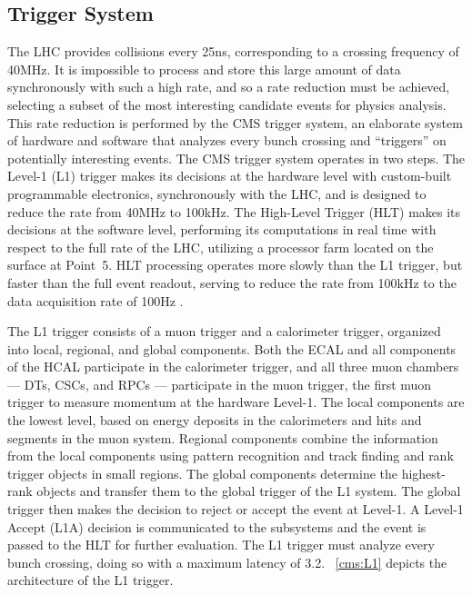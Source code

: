 \subsection{Trigger System}
\label{cms:trigger}
The LHC provides \pp collisions every 25\unit{ns}, corresponding to a crossing frequency of 40\unit{MHz}.
It is impossible to process and store this large amount of data synchronously with such a high rate, and so a rate reduction must be achieved, selecting a subset of the most interesting candidate events for physics analysis.
This rate reduction is performed by the CMS trigger system, an elaborate system of hardware and software that analyzes every bunch crossing and ``triggers'' on potentially interesting events.
The CMS trigger system operates in two steps.
The Level-1 (L1) trigger makes its decisions at the hardware level with custom-built programmable electronics, synchronously with the LHC, and is designed to reduce the rate from 40\unit{MHz} to 100\unit{kHz}.
The High-Level Trigger (HLT) makes its decisions at the software level, performing its computations in real time with respect to the full rate of the LHC, utilizing a processor farm located on the surface at Point~5.
HLT processing operates more slowly than the L1 trigger, but faster than the full event readout, serving to reduce the rate from 100\unit{kHz} to the data acquisition rate of 100\unit{Hz} \cite{Chatrchyan:2008zzk, Adam:2005zf}.

The L1 trigger consists of a muon trigger and a calorimeter trigger, organized into local, regional, and global components.
Both the ECAL and all components of the HCAL participate in the calorimeter trigger, and all three muon chambers --- DTs, CSCs, and RPCs --- participate in the muon trigger, the first muon trigger to measure momentum at the hardware Level-1.
The local components are the lowest level, based on energy deposits in the calorimeters and hits and segments in the muon system.
Regional components combine the information from the local components using pattern recognition and track finding and rank trigger objects in small regions.
The global components determine the highest-rank objects and transfer them to the global trigger of the L1 system.
The global trigger then makes the decision to reject or accept the event at Level-1.
A Level-1 Accept (L1A) decision is communicated to the subsystems and the event is passed to the HLT for further evaluation.
The L1 trigger must analyze every bunch crossing, doing so with a maximum latency of 3.2\mus.
\Fig~\ref{cms:L1} depicts the architecture of the L1 trigger.

